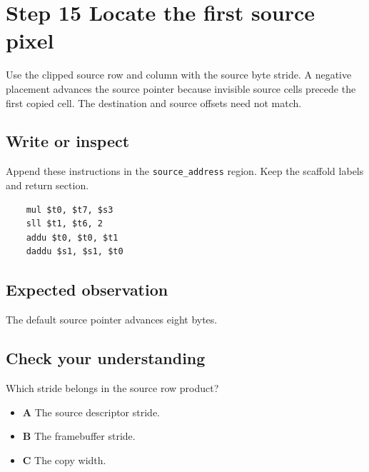 \section{Step 15 Locate the first source pixel}\label{blit-s15}

Use the clipped source row and column with the source byte stride. A negative placement advances the source pointer because invisible source cells precede the first copied cell. The destination and source offsets need not match.

\subsection{Write or inspect}
Append these instructions in the \texttt{source\_address} region. Keep the scaffold labels and return section.

\begin{verbatim}
    mul $t0, $t7, $s3
    sll $t1, $t6, 2
    addu $t0, $t0, $t1
    daddu $s1, $s1, $t0
\end{verbatim}

\subsection{Expected observation}
The default source pointer advances eight bytes.

\subsection{Check your understanding}
Which stride belongs in the source row product?

\begin{itemize}
  \item \textbf{A} The source descriptor stride.
  \item \textbf{B} The framebuffer stride.
  \item \textbf{C} The copy width.
\end{itemize}
